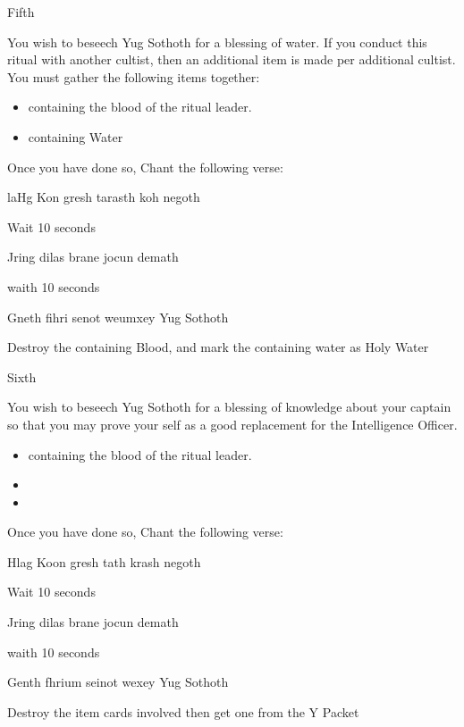 \documentclass[greennotebook]{guildcamp4} %
\begin{document}
\begin{page}{Fifth}
	
		You wish to beseech Yug Sothoth for a blessing of water. If you conduct this ritual with another cultist, then an additional item is made per additional cultist. You must gather the following items together: 
		
		\begin{itemize}
			\item \iTestTube{} containing the blood of the ritual leader.
			\item \iTestTube{} containing Water
		\end{itemize}
		
		Once you have done so, Chant the following verse:
		
		laHg Kon gresh tarasth koh negoth
		
		Wait 10 seconds
		
		Jring dilas brane jocun demath
		
		waith 10 seconds
		
		Gneth fihri senot weumxey Yug Sothoth
		
		Destroy the \iTestTube{} containing Blood, and mark the \iTestTube{} containing water as Holy Water
		
	
\end{page}

\begin{page}{Sixth}
	

	You wish to beseech Yug Sothoth for a blessing of knowledge about your captain so that you may prove your self as a good replacement for the Intelligence Officer.  
		
	\begin{itemize}
			\item \iTestTube{} containing the blood of the ritual leader.
			\item \iGlassLens{}
			\item \iScrapMetal{}
	\end{itemize}
	
	Once you have done so, Chant the following verse:
		
	Hlag Koon gresh tath krash negoth
	
	Wait 10 seconds
	
	Jring dilas brane jocun demath
	
	waith 10 seconds
	
	Genth fhrium seinot wexey Yug Sothoth	
	
	Destroy the item cards involved then get one \iBlackMailD{} from the Y Packet
	
	
\end{page}


\endnotebook
\end{document}
